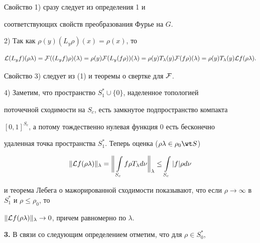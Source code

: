 \begin{pf}


Свойство 1) сразу следует из определения 1 и


соответствующих свойств преобразования Фурье на $G$.





2) Так как $\rho(y)(L_y\rho)(x)=\rho(x)$, то


$$


{\cal L}(L_yf)(\rho\lambda)={\cal F}((L_yf)\rho)(\lambda)=


\rho(y){\cal F}(L_y(f\rho))(\lambda)=


\rho(y)T_\lambda(y){\cal F}(f\rho)(\lambda)=


\rho(y)T_\lambda(y){\cal L}f(\rho\lambda).


$$





Свойство 3) следует из (1) и теоремы о свертке для ${\cal F}$.





4) Заметим, что пространство $S^*_1\cup \{0\}$, наделенное топологией


поточечной сходимости на $S_c$, есть замкнутое подпространство компакта


$[0,1]^{S_c}$, а потому тождественно нулевая функция 0 есть бесконечно


удаленная точка пространства $S^*_1$. Теперь оценка ($\rho\lambda\in


\rho_0\wt S$)


$$


\|{\cal L}f(\rho\lambda)\|_\lambda=


\bigg\|\int\limits_{S_c}f\rho T_\lambda d\nu\bigg\|_\lambda\leq


\int\limits_{S_c}|f|\rho d\nu


$$


и теорема Лебега о мажорированной сходимости показывают, что если $\rho\to


\infty$ в $S^*_1$ и $\rho\leq\rho_0$, то


$\|{\cal L}f(\rho\lambda)\|_\lambda \to 0$, причем равномерно по $\lambda$.


\end{pf}





{\bf 3.} В связи со следующим определением отметим, что для $\rho\in S_0^*$,


